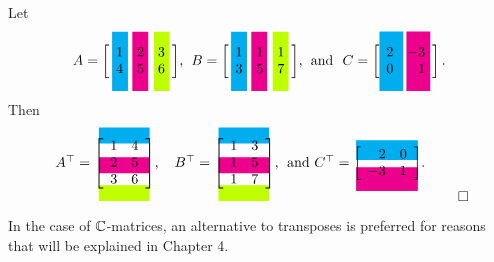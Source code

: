 \begin{Exam}  Let \[\begin{tikzpicture}
\begin{scope}
\clip (-1.5,0.75) rectangle (1.5,-0.75);
\fill[cyan] (-0.4,0.75) rectangle (0,-0.75);
\fill[magenta] (0.11,0.75) rectangle (0.51,-0.75);
\fill[lime] (0.65,0.75) rectangle (1.05,-0.75);
\path (0,0) node {$A = \mtx{rrr}{1&2&3\\4&5&6}$\text{,}};
\end{scope}
\begin{scope}[shift={(3,0)}]
\clip (-1.5,0.75) rectangle (1.5,-0.75);
\fill[cyan] (-0.4,0.75) rectangle (0,-0.75);
\fill[magenta] (0.11,0.75) rectangle (0.51,-0.75);
\fill[lime] (0.65,0.75) rectangle (1.05,-0.75);
\path (0,0) node {$B = \mtx{rrr}{1&1&1\\3&5&7}$\text{,}};
\end{scope}
\begin{scope}[shift={(6.25,0)}]
\fill[cyan] (0.09,0.75) rectangle (0.69,-0.75);
\fill[magenta] (0.77,0.75) rectangle (1.37,-0.75);
\path (0,0) node {\text{ and } $C = \mtx{rr}{2&-3\\0&1}.$};
\end{scope}
\end{tikzpicture}\] Then 
\[
\begin{tikzpicture}
\fill[cyan] (-0.2,0.9) rectangle (1.07,0.5);
\fill[magenta] (-0.2,0.15) rectangle (1.07,-0.25);
\fill[lime] (-0.2,-0.55) rectangle (1.07,-0.95);
\path (0,0) node {$A^\top  = \mtx{rr}{1&4\\2&5\\3&6}$\text{,}};
\begin{scope}[shift={(3,0)}]
\fill[cyan] (-0.2,0.9) rectangle (1.07,0.5);
\fill[magenta] (-0.2,0.15) rectangle (1.07,-0.25);
\fill[lime] (-0.2,-0.55) rectangle (1.07,-0.95);
\path (0,0) node {$B^\top  = \mtx{rr}{1&3\\1&5\\1&7}$\text{,}};
\end{scope}
\begin{scope}[shift={(6.25,0)}]
\fill[cyan] (0,0.58) rectangle (1.55,0.08);
\fill[magenta] (0,-0.1) rectangle (1.55,-0.7);
\path (0,0) node {$\text{and } C^\top  = \mtx{rr}{2&0\\-3&1}$.};
\end{scope}
\end{tikzpicture}
\qedhere\]
\end{Exam}\vs

In the case of $\mathbb{C}$-matrices, an alternative to transposes is preferred for reasons that will be explained in Chapter 4.\\

